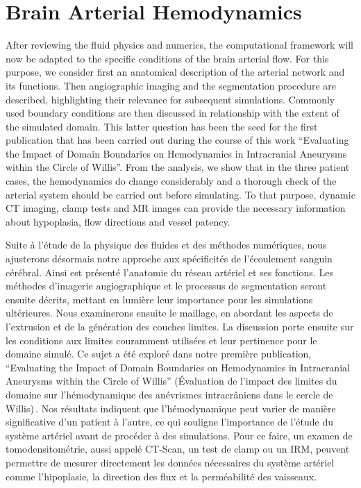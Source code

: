 \pagestyle{fancy}

\chapter{Brain Arterial Hemodynamics}
\minitoc\newpage\label{chap.3}

\begin{tcolorbox}[abstract]

	After reviewing the fluid physics and numerics, the computational framework will now be adapted to the specific conditions of the brain arterial flow. For this purpose, we consider first an anatomical description of the arterial network and its functions. Then angiographic imaging and the segmentation procedure are described, highlighting their relevance for subsequent simulations. Commonly used boundary conditions are then discussed in relationship with the extent of the simulated domain. This latter question has been the seed for the first publication that has been carried out during the course of this work ``Evaluating the Impact of Domain Boundaries on Hemodynamics in Intracranial Aneurysms within the Circle of Willis''\cite{Jeken-Rico2023}. From the analysis, we show that in the three patient cases, the hemodynamics do change considerably and a thorough check of the arterial system should be carried out before simulating. To that purpose, dynamic CT imaging, clamp tests and MR images can provide the necessary information about hypoplasia, flow directions and vessel patency.

	\tcblower

	Suite à l'étude de la physique des fluides et des méthodes numériques, nous ajusterons désormais notre approche aux spécificités de l'écoulement sanguin cérébral. Ainsi est présenté l'anatomie du réseau artériel et ses fonctions. Les méthodes d'imagerie angiographique et le processus de segmentation seront ensuite décrits, mettant en lumière leur importance pour les simulations ultérieures. Nous examinerons ensuite le maillage, en abordant les aspects de l'extrusion et de la génération des couches limites. La discussion porte ensuite sur les conditions aux limites couramment utilisées et leur pertinence pour le domaine simulé. Ce sujet a été exploré dans notre première publication, ``Evaluating the Impact of Domain Boundaries on Hemodynamics in Intracranial Aneurysms within the Circle of Willis'' (Évaluation de l'impact des limites du domaine sur l'hémodynamique des anévrismes intracrâniens dans le cercle de Willis)\,\cite{Jeken-Rico2023}. Nos résultats indiquent que l'hémodynamique peut varier de manière significative d'un patient à l'autre, ce qui souligne l'importance de l'étude du système artériel avant de procéder à des simulations. Pour ce faire, un examen de tomodensitométrie, aussi appelé CT-Scan, un test de clamp ou un IRM, peuvent permettre de mesurer directement les données nécessaires du système artériel comme l'hipoplasie, la direction des flux et la perméabilité des vaisseaux.

\end{tcolorbox}

